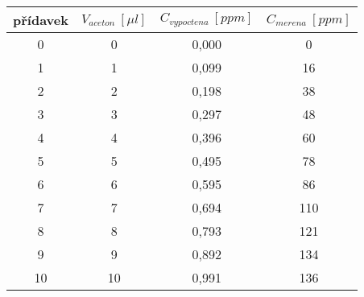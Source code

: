 \begin{tabular}{cccc}
\toprule
přídavek & $V_{aceton}\ [\mu l]$ & $C_{vypoctena}\ [ppm]$ & $C_{merena}\ [ppm]$ \\
\midrule
0 & 0 & 0,000 & 0 \\
1 & 1 & 0,099 & 16 \\
2 & 2 & 0,198 & 38 \\
3 & 3 & 0,297 & 48 \\
4 & 4 & 0,396 & 60 \\
5 & 5 & 0,495 & 78 \\
6 & 6 & 0,595 & 86 \\
7 & 7 & 0,694 & 110 \\
8 & 8 & 0,793 & 121 \\
9 & 9 & 0,892 & 134 \\
10 & 10 & 0,991 & 136 \\
\bottomrule
\end{tabular}

